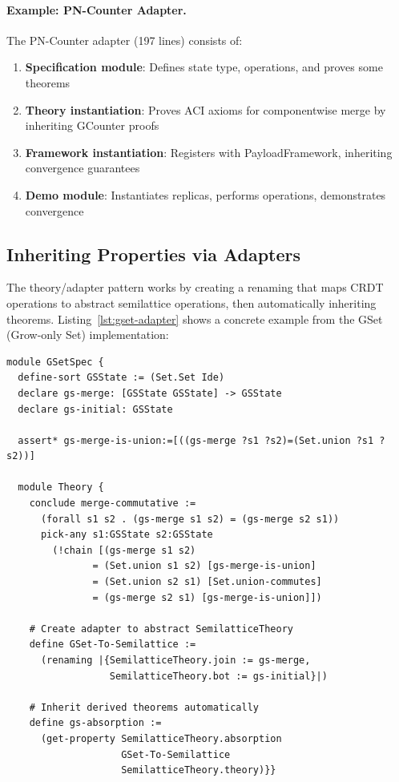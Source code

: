 \paragraph{Example: PN-Counter Adapter.}
The PN-Counter adapter (197 lines) consists of:

\begin{enumerate}
  \item \textbf{Specification module}: Defines state type, operations, and proves some theorems
  \item \textbf{Theory instantiation}: Proves ACI axioms for componentwise merge by inheriting GCounter proofs
  \item \textbf{Framework instantiation}: Registers with PayloadFramework, inheriting convergence guarantees
  \item \textbf{Demo module}: Instantiates replicas, performs operations, demonstrates convergence
\end{enumerate}

\subsection{Inheriting Properties via Adapters}

The theory/adapter pattern works by creating a renaming that maps CRDT operations to abstract semilattice operations, then automatically inheriting theorems. Listing~\ref{lst:gset-adapter} shows a concrete example from the GSet (Grow-only Set) implementation:

\begin{lstlisting}[language=Athena,style=athena,label={lst:gset-adapter},caption={GSet adapter: inheriting semilattice theorems via renaming}]
module GSetSpec {
  define-sort GSState := (Set.Set Ide)
  declare gs-merge: [GSState GSState] -> GSState
  declare gs-initial: GSState
  
  assert* gs-merge-is-union:=[((gs-merge ?s1 ?s2)=(Set.union ?s1 ?s2))]
  
  module Theory {
    conclude merge-commutative :=
      (forall s1 s2 . (gs-merge s1 s2) = (gs-merge s2 s1))
      pick-any s1:GSState s2:GSState
        (!chain [(gs-merge s1 s2)
               = (Set.union s1 s2) [gs-merge-is-union]
               = (Set.union s2 s1) [Set.union-commutes]
               = (gs-merge s2 s1) [gs-merge-is-union]])
    
    # Create adapter to abstract SemilatticeTheory
    define GSet-To-Semilattice :=
      (renaming |{SemilatticeTheory.join := gs-merge,
                  SemilatticeTheory.bot := gs-initial}|)
    
    # Inherit derived theorems automatically
    define gs-absorption :=
      (get-property SemilatticeTheory.absorption
                    GSet-To-Semilattice
                    SemilatticeTheory.theory)}}
\end{lstlisting}

